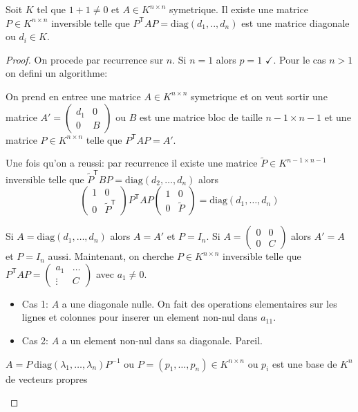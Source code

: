 \begin{theorem}
Soit $K$ tel que $1+1\neq 0$ et $A\in K^{n\times n}$ symetrique. Il existe une matrice $P\in K^{n\times n}$ inversible telle que $P^{\mathsf{T}}AP=\mathrm{diag}(d_{1},..,d_{n})$ est une matrice diagonale ou $d_{i}\in K$.
\end{theorem}
\begin{proof}
On procede par recurrence sur $n$. Si $n=1$ alors $p=1$ $\checkmark$. Pour le cas $n> 1$ on defini un algorithme:

On prend en entree une matrice $A\in K^{n\times n}$ symetrique et on veut sortir une matrice $A'=\begin{pmatrix}d_{1} & 0 \\ 0 & B\end{pmatrix}$ ou $B$ est une matrice bloc de taille $n-1\times n-1$ et une matrice $P\in K^{n\times n}$ telle que $P^{\mathsf{T}}AP=A'$. 

Une fois qu'on a reussi: par recurrence il existe une matrice $\tilde{P}\in K^{n-1\times n-1}$ inversible telle que $\tilde{P}^{\mathsf{T}}BP=\mathrm{diag}(d_{2},\dots,d_{n})$ alors
$$
\begin{pmatrix}
1 & 0 \\
0 & \tilde{P}^{\mathsf{T}} 
\end{pmatrix}P^{\mathsf{T}}AP\begin{pmatrix}
1 & 0 \\
0 & \tilde{P} 
\end{pmatrix}=\mathrm{diag}(d_{1},\dots,d_{n})
$$

Si $A=\mathrm{diag}(d_{1},\dots,d_{n})$ alors $A=A'$ et $P=I_{n}$. Si $A=\begin{pmatrix}0 & 0 \\ 0 & C\end{pmatrix}$ alors $A'=A$ et $P=I_{n}$ aussi. Maintenant, on cherche $P\in K^{n\times n}$ inversible telle que $P^{\mathsf{T}}AP=\begin{pmatrix}a_{1} & \dots \\ \vdots & C\end{pmatrix}$ avec $a_{1}\neq 0$.
\begin{itemize}
\item Cas 1: $A$ a une diagonale nulle. On fait des operations elementaires sur les lignes et colonnes pour inserer un element non-nul dans $a_{11}$.
\item Cas 2: $A$ a un element non-nul dans sa diagonale. Pareil.
\end{itemize}
\begin{reminder}
$A=P~\mathrm{diag}(\lambda_{1},\dots,\lambda _{n})P^{-1}$ ou $P=(p_{1},\dots,p_{n})\in K^{n\times n}$ ou $p_{i}$ est une base de $K^{n}$ de vecteurs propres
\end{reminder}
\end{proof}